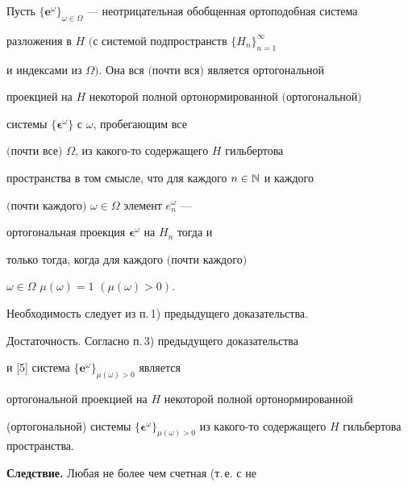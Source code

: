 \begin{thm}\hspace{-1.8mm}{\bf.}


Пусть $\{\boldsymbol e^\omega\}_{\omega


\in\Omega}$ --- неотрицательная обобщенная ортоподобная система


разложения в $H$ $($с системой подпространств $\{H_n\}_{n=1}^\infty$


и индексами из $\Omega)$. Она вся $($почти вся$)$ является ортогональной


проекцией на $H$ некоторой полной ортонормированной $($ортогональной$)$


системы $\{\boldsymbol\epsilon^\omega\}$ с $\omega$, пробегающим все


$($почти все$)$ $\Omega$, из какого-то содержащего $H$ гильбертова


пространства в том смысле, что для каждого $n\in{\Bbb N}$ и каждого


$($почти каждого$)$ $\omega\in\Omega$ элемент $e^\omega_n$ ---


ортогональная проекция $\boldsymbol\epsilon^\omega$ на $H_n$ тогда и


только тогда, когда для каждого $($почти каждого$)$


$\omega\in\Omega$\; $\mu(\omega)=1$ $(\mu(\omega)>0)$.


\end{thm}





\begin{pf}


Необходимость следует из п.\,1) предыдущего доказательства.





Достаточность. Согласно п.\,3) предыдущего доказательства


и [5] система $\{\boldsymbol e^\omega\}_{\mu(\omega)>0}$ является


ортогональной проекцией на $H$ некоторой полной ортонормированной


(ортогональной) системы $\{\boldsymbol\epsilon^\omega\}_{\mu


(\omega)>0}$ из какого-то содержащего $H$ гильбертова пространства.


\end{pf}





{\bf Следствие.} Любая не более чем счетная (т.\,е. с не


